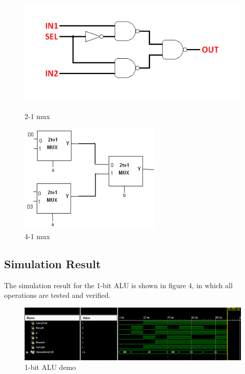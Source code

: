 \documentclass{article}
\begin{document}
\begin{figure}[!htb]
  \includegraphics[width=\linewidth]{mux2-1.png}
  \caption{2-1 mux}\label{fig:mux2-1}
\endminipage\hfill
{}
  \includegraphics[width=\linewidth]{mux4-1.png}
  \caption{4-1 mux}\label{fig:mux4-1}
\endminipage\hfill
\end{figure}

\subsection{Simulation Result}
The simulation result for the 1-bit ALU is shown in figure 4, in which all operations are tested and verified. 
\begin{figure}[h]
  \centering
  \includegraphics[width=\linewidth]{lab1-1.PNG}
  \caption{1-bit ALU demo}
  \label{fig:1-ALU}
\end{figure}
\end{document}

